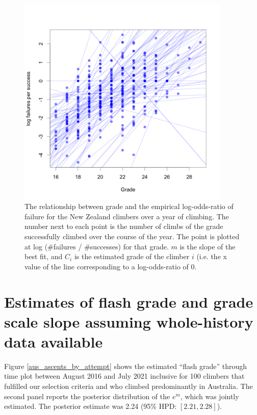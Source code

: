 \documentclass[11pt]{article}
\begin{document}
\begin{figure}
\centering
\includegraphics[width=0.9\textwidth]{figures/nz/ascents-from-2016-08-01-to-2021-08-01-minAscents30-minFails1-Sport-AU-session-regression.png}
\caption{\small The relationship between grade and the empirical log-odds-ratio of failure for the New Zealand climbers over a year of climbing. The number next to each point is the number of climbs of the grade successfully climbed over the course of the year. The point is plotted at log (\#failures / \#successes) for that grade. $m$ is the slope of the best fit, and $C_i$ is the estimated grade of the climber $i$ (i.e. the x value of the line corresponding to a log-odds-ratio of 0.}
\label{fig2}
\end{figure}

\section{Estimates of flash grade and grade scale slope assuming whole-history data available}

Figure \ref{aus_ascents_by_attempt} shows the estimated ``flash grade'' through time plot between August 2016 and July 2021 inclusive for 100 climbers that fulfilled our selection criteria and who climbed predominantly in Australia. The second panel reports the posterior distribution of the $e^m$, which was jointly estimated. The posterior estimate was 2.24 (95\% HPD:  $[2.21, 2.28]$).
\end{document}
